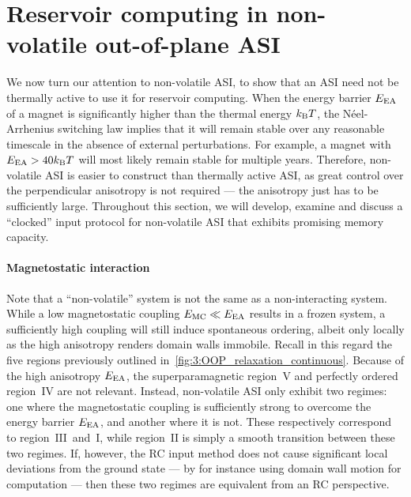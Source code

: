 \section{Reservoir computing in non-volatile out-of-plane ASI}
We now turn our attention to non-volatile ASI, to show that an ASI need not be thermally active to use it for reservoir computing.
When the energy barrier $E_\mathrm{EA}$ of a magnet is significantly higher than the thermal energy $\kBT$, the N\'eel-Arrhenius switching law implies that it will remain stable over any reasonable timescale in the absence of external perturbations.
For example, a magnet with $\EEA > 40 \kBT$ will most likely remain stable for multiple years.
Therefore, non-volatile ASI is easier to construct than thermally active ASI, as great control over the perpendicular anisotropy is not required --- the anisotropy just has to be sufficiently large.
Throughout this section, we will develop, examine and discuss a ``clocked'' input protocol for non-volatile ASI that exhibits promising memory capacity.

\paragraph{Magnetostatic interaction}
Note that a ``non-volatile'' system is not the same as a non-interacting system.
While a low magnetostatic coupling $E_\mathrm{MC} \ll E_\mathrm{EA}$ results in a frozen system, a sufficiently high coupling will still induce spontaneous ordering, albeit only locally as the high anisotropy renders domain walls immobile.
Recall in this regard the five regions previously outlined in~\cref{fig:3:OOP_relaxation_continuous}.
Because of the high anisotropy $E_\mathrm{EA}$, the superparamagnetic region~$\mathrm{V}$ and perfectly ordered region~$\mathrm{IV}$ are not relevant.
Instead, non-volatile ASI only exhibit two regimes: one where the magnetostatic coupling is sufficiently strong to overcome the energy barrier $E_\mathrm{EA}$, and another where it is not.
These respectively correspond to region~$\mathrm{III}$~and~$\mathrm{I}$, while region~$\mathrm{II}$ is simply a smooth transition between these two regimes.
If, however, the RC input method does not cause significant local deviations from the ground state --- by for instance using domain wall motion for computation --- then these two regimes are equivalent from an RC perspective. \par


